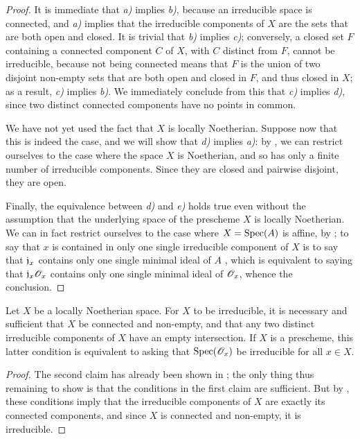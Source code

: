 \begin{proof}
\label{proof-1.6.1.10}
It is immediate that \emph{a)} implies \emph{b)}, because an irreducible space is connected, and \emph{a)} implies that the irreducible components of $X$ are the sets that are both open and closed.
It is trivial that \emph{b)} implies \emph{c)}; conversely, a closed set $F$ containing a connected component $C$ of $X$, with $C$ distinct from $F$, cannot be irreducible, because not being connected means that $F$ is the union of two disjoint non-empty sets that are both open and closed in $F$, and thus closed in $X$;
as a result, \emph{c)} implies \emph{b)}.
We immediately conclude from this that \emph{c)} implies \emph{d)}, since two distinct connected components have no points in common.

We have not yet used the fact that $X$ is locally Noetherian.
Suppose now that this is indeed the case, and we will show that \emph{d)} implies \emph{a)}: by , we can restrict ourselves to the case where the space $X$ is Noetherian, and so has only a finite number of irreducible components.
Since they are closed and pairwise disjoint, they are open.

Finally, the equivalence between \emph{d)} and \emph{e)} holds true even without the assumption that the underlying space of the prescheme $X$ is locally Noetherian.
We can in fact restrict ourselves to the case where $X={\mathop{\mathrm{Spec}}\nolimits}(A)$ is affine, by ;
to say that $x$ is contained in only one single irreducible component of $X$ is to say that $\mathfrak{j}_x$ contains only one single minimal ideal of $A$ , which is equivalent to saying that $\mathfrak{j}_x\mathscr{O}_x$ contains only one single minimal ideal of $\mathscr{O}_x$, whence the conclusion.
\end{proof}

\begin{cor}[6.1.11]
\label{1.6.1.11}
Let $X$ be a locally Noetherian space.
For $X$ to be irreducible, it is necessary and sufficient that $X$ be connected and non-empty, and that any two distinct irreducible components of $X$ have an empty intersection.
If $X$ is a prescheme, this latter condition is equivalent to asking that ${\mathop{\mathrm{Spec}}\nolimits}(\mathscr{O}_x)$ be irreducible for all $x\in X$.
\end{cor}

\begin{proof}
\label{proof-1.6.1.11}
The second claim has already been shown in ;
the only thing thus remaining to show is that the conditions in the first claim are sufficient.
But by , these conditions imply that the irreducible components of $X$ are exactly its connected components, and since $X$ is connected and non-empty, it is irreducible.
\end{proof}

